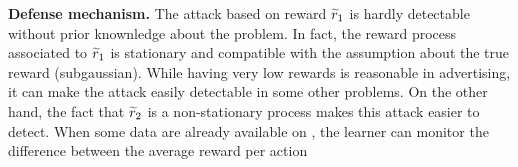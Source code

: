 \textbf{Defense mechanism.}
The attack based on reward $\widetilde{r}_1$ is hardly detectable without prior knownledge about the problem.
In fact, the reward process associated to $\widetilde{r}_1$ is stationary and compatible with the assumption about the true reward (\eg subgaussian). While having very low rewards is reasonable in advertising, it can make the attack easily detectable in some other problems.
On the other hand, the fact that $\widetilde{r}_2$ is a non-stationary process makes this attack easier to detect.
When some data are already available on , the learner can monitor the difference between the average reward per action %



